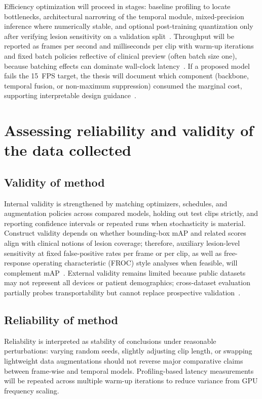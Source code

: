 \documentclass[
english,                 %
bibtex,                  %
]{kththesis}
\numberwithin{listing}{chapter}
\begin{document}
Efficiency optimization will proceed in stages: baseline profiling to locate bottlenecks, architectural narrowing of the temporal module, mixed-precision inference where numerically stable, and optional post-training quantization only after verifying lesion sensitivity on a validation split~\cite{liu2023_edgemednet}.
Throughput will be reported as frames per second and milliseconds per clip with warm-up iterations and fixed batch policies reflective of clinical preview (often batch size one), because batching effects can dominate wall-clock latency~\cite{liu2023_edgemednet}.
If a proposed model fails the \SI{15}{FPS} target, the thesis will document which component (backbone, temporal fusion, or non-maximum suppression) consumed the marginal cost, supporting interpretable design guidance~\cite{lin2022_buv_miccai,liu2023_edgemednet}.


\section{Assessing reliability and validity of the data collected}
\label{sec:assessingReliability}

\subsection{Validity of method}
\label{sec:validtyOfMethod}

Internal validity is strengthened by matching optimizers, schedules, and augmentation policies across compared models, holding out test clips strictly, and reporting confidence intervals or repeated runs when stochasticity is material.
Construct validity depends on whether bounding-box mAP and related scores align with clinical notions of lesion coverage; therefore, auxiliary lesion-level sensitivity at fixed false-positive rates per frame or per clip, as well as free-response operating characteristic (FROC) style analyses when feasible, will complement mAP~\cite{lin2017_focal_loss_retinanet,lin2022_buv_miccai}.
External validity remains limited because public datasets may not represent all devices or patient demographics; cross-dataset evaluation partially probes transportability but cannot replace prospective validation~\cite{dan2024_breast_us_dl_review}.

\subsection{Reliability of method}

Reliability is interpreted as stability of conclusions under reasonable perturbations: varying random seeds, slightly adjusting clip length, or swapping lightweight data augmentations should not reverse major comparative claims between frame-wise and temporal models.
Profiling-based latency measurements will be repeated across multiple warm-up iterations to reduce variance from GPU frequency scaling.
\end{document}
